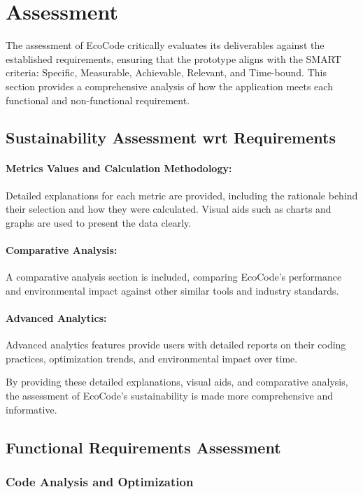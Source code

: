 \documentclass[conference,compsoc]{IEEEtran}
\begin{document}
\section{Assessment}
The assessment of EcoCode critically evaluates its deliverables against the established requirements, ensuring that the prototype aligns with the SMART criteria: Specific, Measurable, Achievable, Relevant, and Time-bound. This section provides a comprehensive analysis of how the application meets each functional and non-functional requirement.

\subsection{Sustainability Assessment wrt Requirements}
\label{sec:sustainability_assessment}

\paragraph{Metrics Values and Calculation Methodology:}
Detailed explanations for each metric are provided, including the rationale behind their selection and how they were calculated. Visual aids such as charts and graphs are used to present the data clearly.


\paragraph{Comparative Analysis:}
A comparative analysis section is included, comparing EcoCode's performance and environmental impact against other similar tools and industry standards.

\paragraph{Advanced Analytics:}
Advanced analytics features provide users with detailed reports on their coding practices, optimization trends, and environmental impact over time.

By providing these detailed explanations, visual aids, and comparative analysis, the assessment of EcoCode's sustainability is made more comprehensive and informative.

\subsection{Functional Requirements Assessment}
\subsubsection{Code Analysis and Optimization}
\end{document}

